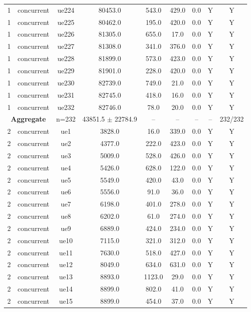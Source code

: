 \begin{table}[ht]
\begin{tabular}{|c|c|c|c|c|c|c|c|c|}
1 & concurrent & ue224 & 80453.0 & 543.0 & 429.0 & 0.0 & Y & Y \\
1 & concurrent & ue225 & 80462.0 & 195.0 & 420.0 & 0.0 & Y & Y \\
1 & concurrent & ue226 & 81305.0 & 655.0 & 17.0 & 0.0 & Y & Y \\
1 & concurrent & ue227 & 81308.0 & 341.0 & 376.0 & 0.0 & Y & Y \\
1 & concurrent & ue228 & 81899.0 & 573.0 & 423.0 & 0.0 & Y & Y \\
1 & concurrent & ue229 & 81901.0 & 228.0 & 420.0 & 0.0 & Y & Y \\
1 & concurrent & ue230 & 82739.0 & 749.0 & 21.0 & 0.0 & Y & Y \\
1 & concurrent & ue231 & 82745.0 & 418.0 & 16.0 & 0.0 & Y & Y \\
1 & concurrent & ue232 & 82746.0 & 78.0 & 20.0 & 0.0 & Y & Y \\
\multicolumn{2}{|c|}{\textbf{Aggregate}} & n=232 & 43851.5 $\pm$ 22784.9 & -- & -- & -- & -- & 232/232 \\
\hline
2 & concurrent & ue1 & 3828.0 & 16.0 & 339.0 & 0.0 & Y & Y \\
2 & concurrent & ue2 & 4377.0 & 222.0 & 423.0 & 0.0 & Y & Y \\
2 & concurrent & ue3 & 5009.0 & 528.0 & 426.0 & 0.0 & Y & Y \\
2 & concurrent & ue4 & 5426.0 & 628.0 & 122.0 & 0.0 & Y & Y \\
2 & concurrent & ue5 & 5549.0 & 420.0 & 43.0 & 0.0 & Y & Y \\
2 & concurrent & ue6 & 5556.0 & 91.0 & 36.0 & 0.0 & Y & Y \\
2 & concurrent & ue7 & 6198.0 & 401.0 & 278.0 & 0.0 & Y & Y \\
2 & concurrent & ue8 & 6202.0 & 61.0 & 274.0 & 0.0 & Y & Y \\
2 & concurrent & ue9 & 6889.0 & 424.0 & 234.0 & 0.0 & Y & Y \\
2 & concurrent & ue10 & 7115.0 & 321.0 & 312.0 & 0.0 & Y & Y \\
2 & concurrent & ue11 & 7630.0 & 518.0 & 427.0 & 0.0 & Y & Y \\
2 & concurrent & ue12 & 8049.0 & 634.0 & 631.0 & 0.0 & Y & Y \\
2 & concurrent & ue13 & 8893.0 & 1123.0 & 29.0 & 0.0 & Y & Y \\
2 & concurrent & ue14 & 8899.0 & 802.0 & 41.0 & 0.0 & Y & Y \\
2 & concurrent & ue15 & 8899.0 & 454.0 & 37.0 & 0.0 & Y & Y \\

\end{tabular}
\end{table}
